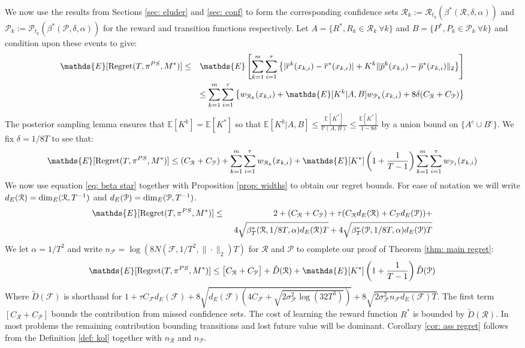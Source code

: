 \documentclass{article}
\newcommand{\Exp}{\mathds{E}}
\newcommand{\Prob}{\mathds{P}}
\newcommand{\Pc}{\mathcal{P}}
\newcommand{\Fc}{\mathcal{F}}
\newcommand{\Rc}{\mathcal{R}}
\begin{document}
We now use the results from Sections \ref{sec: eluder} and \ref{sec: conf} to form the corresponding confidence sets $\Rc_k := \Rc_{t_k}(\beta^*(\Rc,\delta,\alpha))$ and $\Pc_k := \Pc_{t_k}(\beta^*(\Pc,\delta,\alpha))$ for the reward and transition functions respectively.
Let $A = \{R^*, R_k \in \Rc_k \ \forall k \}$ and $B = \{P^*,P_k \in \Pc_k \ \forall k \}$ and condition upon these events to give:
\begin{eqnarray}
\label{eq: reg widths}
	\Exp[{\rm Regret}(T,\pi^{PS},M^*)] &\le&
	\Exp\left[ \sum_{k=1}^m \sum_{i=1}^\tau
		\left\{ | \overline{r}^k(x_{k,i}) - \overline{r}^*(x_{k,i})|
		+ K^k \|\overline{p}^k(x_{k,i}) - \overline{p}^*(x_{k,i}) \|_2 \right\}\right] \nonumber \\
	&& \hspace{-10mm} \le \sum_{k=1}^m \sum_{i=1}^\tau \left\{ w_{\Rc_k}(x_{k,i}) +
		 \Exp[K^k|A,B] w_{\Pc_k}(x_{k,i}) + 8 \delta (C_\Rc + C_\Pc) \right\}
\end{eqnarray}
The posterior sampling lemma ensures that $\Exp[K^k] = \Exp[K^*]$ so that
$\Exp[K^k|A,B] \le \frac{\Exp[K^*]}{\Prob(A,B)} \le \frac{\Exp[K^*]}{1-8\delta}$
by a union bound on $\{A^c \cup B^c\}$.
We fix $\delta = 1/8T$ to see that:
{\small
$$ \Exp[{\rm Regret}(T,\pi^{PS},M^*)] \le (C_\Rc + C_\Pc) +
	\sum_{k=1}^m \sum_{i=1}^\tau w_{\Rc_k}(x_{k,i})
	+ \Exp[K^*] \left(1+\frac{1}{T-1} \right)\sum_{k=1}^m \sum_{i=1}^\tau w_{\Pc_t}(x_{k,i})  $$
}
We now use equation \eqref{eq: beta star} together with Proposition \ref{prop: widths} to obtain our regret bounds.
For ease of notation we will write $d_E(\Rc) = {\rm dim}_E(\Rc,T^{-1})$ and $d_E(\Pc) = {\rm dim}_E(\Pc,T^{-1})$.
\begin{eqnarray}
	\Exp[{\rm Regret}(T,\pi^{PS},M^*)] &\le&
	2 + (C_\Rc + C_\Pc) + \tau(C_\Rc d_E(\Rc)+ C_\Pc d_E(\Pc)) + \nonumber \\
	&& \  4 \sqrt{\beta_T^*(\Rc,1/8T,\alpha) d_E(\Rc) T} + 4 \sqrt{\beta_T^*(\Pc,1/8T,\alpha) d_E(\Pc) T}
\end{eqnarray}
We let $\alpha = 1/T^2$ and write $n_\Fc = \log(8 N(\Fc,1/T^2,\|\cdot\|_2)T)$ for $\Rc$ and $\Pc$ to complete our proof of Theorem \ref{thm: main regret}:
\begin{eqnarray}
\label{eq: reg proof}
    \Exp[{\rm Regret}(T,\pi^{PS},M^*)] \le \big[ C_\Rc + C_\Pc \big] + \tilde{D}(\Rc)
     + \Exp[K^*]\left(1+\frac{1}{T-1}\right) \tilde{D}(\Pc)
\end{eqnarray}
Where $\tilde{D}(\Fc)$ is shorthand for $ 1 + \tau C_\Fc d_E(\Fc) + 8\sqrt{d_E(\Fc)(4C_\Fc + \sqrt{2\sigma_\Fc^2 \log(32T^3)})} + 8\sqrt{2 \sigma_\Fc^2 n_\Fc d_E(\Fc) T}$.
The first term $[C_\Rc + C_\Pc]$ bounds the contribution from missed confidence sets.
The cost of learning the reward function $R^*$ is bounded by $\tilde{D}(\Rc)$.
In most problems the remaining contribution bounding transitions and lost future value will be dominant.
Corollary \ref{cor: ass regret} follows from the Definition \ref{def: kol} together with $n_\Rc$ and $n_\Pc$.
\end{document}
